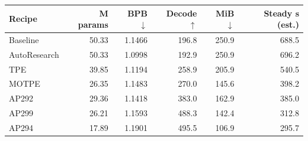 \begin{tabular}{lrrrrr}
\toprule
Recipe & M params & BPB $\downarrow$ & Decode $\uparrow$ & MiB $\downarrow$ & Steady s (est.) \\
\midrule
Baseline & 50.33 & 1.1466 & 196.8 & 250.9 & 688.5 \\
AutoResearch & 50.33 & 1.0998 & 192.9 & 250.9 & 696.2 \\
TPE & 39.85 & 1.1194 & 258.9 & 205.9 & 540.5 \\
MOTPE & 26.35 & 1.1483 & 270.0 & 145.6 & 398.2 \\
AP292 & 29.36 & 1.1418 & 383.0 & 162.9 & 385.0 \\
AP299 & 26.21 & 1.1593 & 488.3 & 142.4 & 312.8 \\
AP294 & 17.89 & 1.1901 & 495.5 & 106.9 & 295.7 \\
\bottomrule
\end{tabular}
